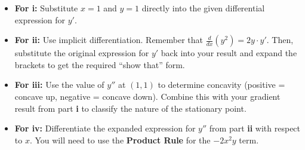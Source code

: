 \begin{hint}
\begin{itemize}
    \item \textbf{For i:} Substitute $x=1$ and $y=1$ directly into the given differential expression for $y'$.
    \item \textbf{For ii:} Use implicit differentiation. Remember that $\frac{d}{dx}(y^2) = 2y \cdot y'$. Then, substitute the original expression for $y'$ back into your result and expand the brackets to get the required ``show that'' form.
    \item \textbf{For iii:} Use the value of $y''$ at $(1,1)$ to determine concavity (positive = concave up, negative = concave down). Combine this with your gradient result from part \textbf{i} to classify the nature of the stationary point.
    \item \textbf{For iv:} Differentiate the expanded expression for $y''$ from part \textbf{ii} with respect to $x$. You will need to use the \textbf{Product Rule} for the $-2x^2 y$ term.
\end{itemize}
\end{hint}

